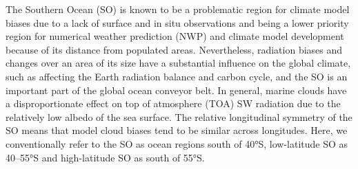 \documentclass[12pt,a4paper]{article}
\begin{document}
The Southern Ocean (SO) is known to be a problematic region for climate model
biases due to a lack of surface and in situ observations and being a lower
priority region for numerical weather prediction (NWP) and climate model
development because of its distance from populated areas.  Nevertheless,
radiation biases and changes over an area of its size have a substantial
influence on the global climate, such as affecting the Earth radiation balance
and carbon cycle, and the SO is an important part of the global ocean conveyor
belt. In general, marine clouds have a disproportionate effect on top of
atmosphere (TOA) SW radiation due to the relatively low albedo of the sea
surface.  The relative longitudinal symmetry of the SO means that model cloud
biases tend to be similar across longitudes.  Here, we conventionally refer to
the SO as ocean regions south of 40°S, low-latitude SO as 40--55°S and
high-latitude SO as south of 55°S.
\end{document}
